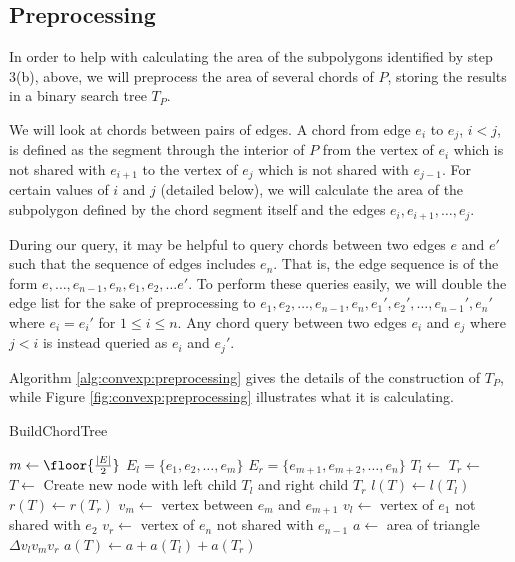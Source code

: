 \subsection{Preprocessing}
\label{:convexp:preprocessing}

In order to help with calculating the area of the subpolygons identified by step 3(b), above, we will preprocess the area of several chords of $P$, storing the results in a binary search tree $T_P$. 

We will look at chords between pairs of edges. 
A chord from edge $e_i$ to $e_j$, $i < j$, is defined as the segment through the interior of $P$ from the vertex of $e_i$ which is not shared with $e_{i+1}$ to the vertex of $e_j$ which is not shared with $e_{j-1}$.
For certain values of $i$ and $j$ (detailed below), we will calculate the area of the subpolygon defined by the chord segment itself and the edges $e_i, e_{i+1}, \ldots, e_j$.

During our query, it may be helpful to query chords between two edges $e$ and $e'$ such that the sequence of edges includes $e_n$.
That is, the edge sequence is of the form $e, \ldots, e_{n-1}, e_{n}, e_{1}, e_{2}, \ldots e'$.
To perform these queries easily, we will double the edge list for the sake of preprocessing to $e_1, e_2, \ldots, e_{n-1}, e_{n}, e_{1}', e_{2}', \ldots, e_{n-1}', e_n'$ where $e_i = e_i'$ for $1 \leq i \leq n$.
Any chord query between two edges $e_i$ and $e_j$ where $j < i$ is instead queried as $e_i$ and $e_j'$.

Algorithm \ref{alg:convexp:preprocessing} gives the details of the construction of $T_P$, while Figure \ref{fig:convexp:preprocessing} illustrates what it is calculating.

\begin{algorithm}
\LinesNumbered
\DontPrintSemicolon
\caption{BuildChordTree}
\label{alg:convexp:preprocessing}
\BlankLine
{}
$m \gets \floor{\frac{|E|}{2}}$\;
$E_l = \{ e_1, e_2, \ldots, e_m \}$\;
$E_r = \{ e_{m+1}, e_{m+2}, \ldots, e_n \}$\;
$T_l \gets $ \;
$T_r \gets $ \;
$T \gets $ Create new node with left child $T_l$ and right child $T_r$\;
$l(T) \gets l(T_l)$\;
$r(T) \gets r(T_r)$\;
$v_m \gets $ vertex between $e_m$ and $e_{m+1}$\;
$v_l \gets $ vertex of $e_1$ not shared with $e_2$\;
$v_r \gets $ vertex of $e_n$ not shared with $e_{n-1}$\;
$a \gets $ area of triangle $\Delta v_l v_m v_r$\;
$a(T) \gets a + a(T_l) + a(T_r)$\;
\BlankLine
{}
\end{algorithm}

